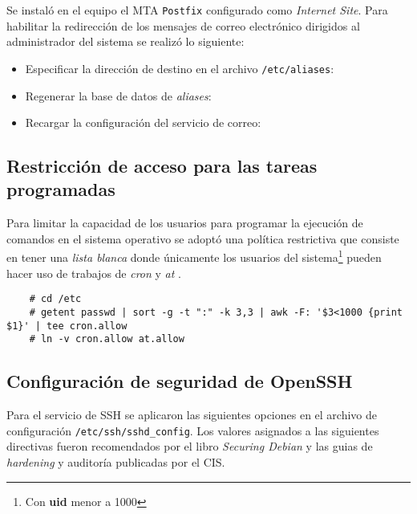 Se instal\'{o} en el equipo el \gls{MTA} \texttt{Postfix} configurado como \textit{Internet Site}. Para habilitar la redirecci\'{o}n de los mensajes de correo electr\'{o}nico dirigidos al administrador del sistema se realiz\'{o} lo siguiente:

\begin{itemize}
  \item Especificar la direcci\'{o}n de destino en el archivo \texttt{/etc/aliases}:

  \item Regenerar la base de datos de \emph{\gls{aliases}}:

  \item Recargar la configuraci\'{o}n del servicio de correo:
\end{itemize}

      \subsection {Restricci\'{o}n de acceso para las tareas programadas}

Para limitar la capacidad de los usuarios para programar la ejecuci\'{o}n de comandos en el sistema operativo se adopt\'{o} una pol\'{i}tica restrictiva que consiste en tener una \textit{lista blanca} donde \'{u}nicamente los usuarios del sistema\footnote{Con \textbf{uid} menor a 1000} pueden hacer uso de trabajos de \emph{\gls{cron}} y \emph{\gls{at}} \cite{_debian_????-1} \cite{_crontab_????} \cite{_at_????}.

{
\scriptsize
\linespread{1}
\begin{verbatim}
    # cd /etc
    # getent passwd | sort -g -t ":" -k 3,3 | awk -F: '$3<1000 {print $1}' | tee cron.allow
    # ln -v cron.allow at.allow
\end{verbatim}
}

      \subsection {Configuraci\'{o}n de seguridad de \textup{OpenSSH}}

Para el servicio de \textsc{\gls{SSH}} se aplicaron las siguientes opciones en el archivo de configuraci\'{o}n \texttt{/etc/ssh/sshd\_config}. Los valores asignados a las siguientes directivas fueron recomendados por el libro \emph{Securing Debian}\cite{_securing_????} y las guias de \emph{hardening} y auditor\'{i}a publicadas por el \textsc{\gls{CIS}}\cite{_benchmarks_????}.

